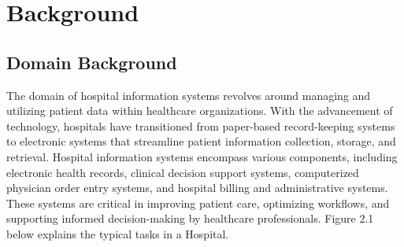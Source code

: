 



\cleardoublepage



\chapter{Background}
\section{Domain Background}
The domain of hospital information systems revolves around managing and utilizing patient data within healthcare organizations. With the advancement of technology, hospitals have transitioned from paper-based record-keeping systems to electronic systems that streamline patient information collection, storage, and retrieval. Hospital information systems encompass various components, including electronic health records, clinical decision support systems, computerized physician order entry systems, and hospital billing and administrative systems. These systems are critical in improving patient care, optimizing workflows, and supporting informed decision-making by healthcare professionals. Figure 2.1 below explains the typical tasks in a Hospital.

